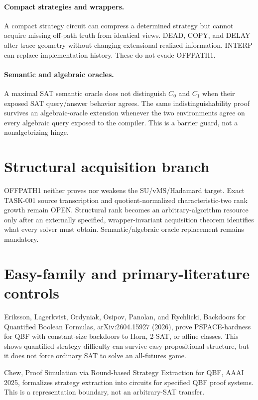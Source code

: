 \documentclass[11pt]{article}
\begin{document}
\paragraph{Compact strategies and wrappers.}
A compact strategy circuit can compress a determined strategy but cannot acquire missing off-path truth from identical views. DEAD, COPY, and DELAY alter trace geometry without changing extensional realized information. INTERP can replace implementation history. These do not evade OFFPATH1.

\paragraph{Semantic and algebraic oracles.}
A maximal SAT semantic oracle does not distinguish \(C_0\) and \(C_1\) when their exposed SAT query/answer behavior agrees. The same indistinguishability proof survives an algebraic-oracle extension whenever the two environments agree on every algebraic query exposed to the compiler. This is a barrier guard, not a nonalgebrizing hinge.

\section*{Structural acquisition branch}
OFFPATH1 neither proves nor weakens the SU/vMS/Hadamard target. Exact TASK-001 source transcription and quotient-normalized characteristic-two rank growth remain OPEN. Structural rank becomes an arbitrary-algorithm resource only after an externally specified, wrapper-invariant acquisition theorem identifies what every solver must obtain. Semantic/algebraic oracle replacement remains mandatory.

\section*{Easy-family and primary-literature controls}
Eriksson, Lagerkvist, Ordyniak, Osipov, Panolan, and Rychlicki, Backdoors for Quantified Boolean Formulas, arXiv:2604.15927 (2026), prove PSPACE-hardness for QBF with constant-size backdoors to Horn, 2-SAT, or affine classes. This shows quantified strategy difficulty can survive easy propositional structure, but it does not force ordinary SAT to solve an all-futures game.

Chew, Proof Simulation via Round-based Strategy Extraction for QBF, AAAI 2025, formalizes strategy extraction into circuits for specified QBF proof systems. This is a representation boundary, not an arbitrary-SAT transfer.
\end{document}
